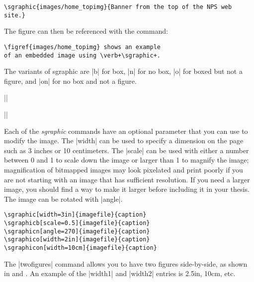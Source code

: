 \begin{Verbatim}[fontsize=\small]
\sgraphic{images/home_topimg}{Banner from the top of the NPS web site.}
\end{Verbatim}

The figure can then be referenced with the command:

\begin{Verbatim}
\figref{images/home_topimg} shows an example 
of an embedded image using \verb+\sgraphic+.
\end{Verbatim}


The variants of sgraphic are |b| for box, |n| for no box, |o| for boxed but not a figure, and |on| for no box and not a figure.

||

||



Each of the \emph{sgraphic} commands have an optional parameter that
you can use to modify the image.  The |width| can be used to specify a
dimension on the page such as 3 inches or 10 centimeters.  The |scale|
can be used with either a number between 0 and 1 to scale down the
image or larger than 1 to magnify the image; magnification of
bitmapped images may look pixelated and print poorly if you are not
starting with an image that has sufficient resolution. If
you need a larger image, you should find a way to make it larger
before including it in your thesis.  The image can be rotated with
|angle|.

\begin{Verbatim}
\sgraphic[width=3in]{imagefile}{caption}
\sgraphicb[scale=0.5]{imagefile}{caption}
\sgraphicn[angle=270]{imagefile}{caption}
\sgraphico[width=2in]{imagefile}{caption}
\sgraphicon[width=10cm]{imagefile}{caption}
\end{Verbatim}

The |twofigures| command allows you to have two figures side-by-side, 
as shown in  and .
An example of the |width1| and |width2| entries is 2.5in, 10cm, etc.

